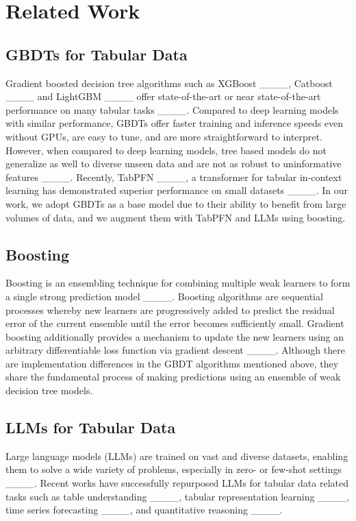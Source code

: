 \section{Related Work}
\label{related_work}

\subsection{GBDTs for Tabular Data}
Gradient boosted decision tree algorithms such as XGBoost ____, Catboost ____ and LightGBM ____ offer state-of-the-art or near state-of-the-art performance on many tabular tasks ____. Compared to deep learning models with similar performance, GBDTs offer faster training and inference speeds even without GPUs, are easy to tune, and are more straightforward to interpret. However, when compared to deep learning models, tree based models do not generalize as well to diverse unseen data and are not as robust to uninformative features ____.  Recently, TabPFN ____, a transformer for tabular in-context learning has demonstrated superior performance on small datasets ____.  In our work, we adopt GBDTs as a base model due to their ability to benefit from large volumes of data, and we augment them with TabPFN and LLMs using boosting.

\subsection{Boosting}
Boosting is an ensembling technique for combining multiple weak learners to form a single strong prediction model ____. Boosting algorithms are sequential processes whereby new learners are progressively added to predict the residual error of the current ensemble until the error becomes sufficiently small. Gradient boosting additionally provides a mechanism to update the new learners using an arbitrary differentiable loss function via gradient descent ____. Although there are implementation differences in the GBDT algorithms mentioned above, they share the fundamental process of making predictions using an ensemble of weak decision tree models.

\subsection{LLMs for Tabular Data}
Large language models (LLMs) are trained on vast and diverse datasets, enabling them to solve a wide variety of problems, especially in zero- or few-shot settings ____. Recent works have successfully repurposed LLMs for tabular data related tasks such as table understanding ____, tabular representation learning ____, time series forecasting ____, and quantitative reasoning ____.

